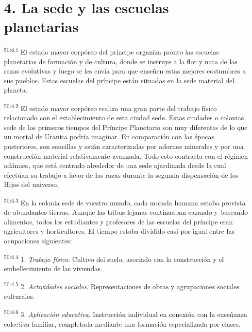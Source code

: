 \section*{4. La sede y las escuelas planetarias}
\par
\textsuperscript{50:4.1} El estado mayor corpóreo del príncipe organiza pronto las escuelas planetarias de formación y de cultura, donde se instruye a la flor y nata de las razas evolutivas y luego se les envía para que enseñen estas mejores costumbres a sus pueblos. Estas escuelas del príncipe están situadas en la sede material del planeta.

\par
\textsuperscript{50:4.2} El estado mayor corpóreo realiza una gran parte del trabajo físico relacionado con el establecimiento de esta ciudad sede. Estas ciudades o colonias sede de los primeros tiempos del Príncipe Planetario son muy diferentes de lo que un mortal de Urantia podría imaginar. En comparación con las épocas posteriores, son sencillas y están caracterizadas por adornos minerales y por una construcción material relativamente avanzada. Todo esto contrasta con el régimen adámico, que está centrado alrededor de una sede ajardinada desde la cual efectúan su trabajo a favor de las razas durante la segunda dispensación de los Hijos del universo.

\par
\textsuperscript{50:4.3} En la colonia sede de vuestro mundo, cada morada humana estaba provista de abundantes tierras. Aunque las tribus lejanas continuaban cazando y buscando alimentos, todos los estudiantes y profesores de las escuelas del príncipe eran agricultores y horticultores. El tiempo estaba dividido casi por igual entre las ocupaciones siguientes:

\par
\textsuperscript{50:4.4} 1. \textit{Trabajo físico}. Cultivo del suelo, asociado con la construcción y el embellecimiento de las viviendas.

\par
\textsuperscript{50:4.5} 2. \textit{Actividades sociales}. Representaciones de obras y agrupaciones sociales culturales.

\par
\textsuperscript{50:4.6} 3. \textit{Aplicación educativa}. Instrucción individual en conexión con la enseñanza colectiva familiar, completada mediante una formación especializada por clases.

